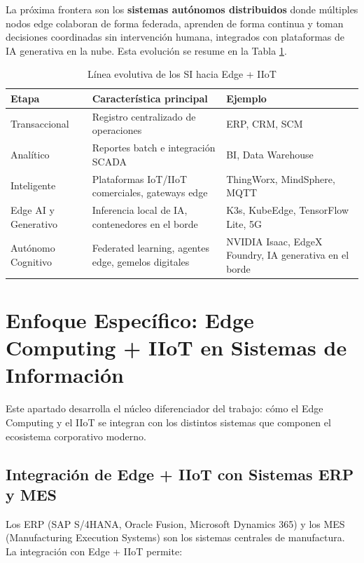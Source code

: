 ﻿\documentclass[12pt,a4paper,oneside]{article}
\begin{document}
La próxima frontera son los \textbf{sistemas autónomos distribuidos} donde múltiples nodos edge colaboran de forma federada, aprenden de forma continua y toman decisiones coordinadas sin intervención humana, integrados con plataformas de IA generativa en la nube. Esta evolución se resume en la Tabla \ref{tab:evolucion}.

\begin{table}[h!]
\centering
\caption{Línea evolutiva de los SI hacia Edge + IIoT}
\label{tab:evolucion}
\begin{tabular}{p{3.5cm} p{5cm} p{5cm}}
\toprule
\textbf{Etapa} & \textbf{Característica principal} & \textbf{Ejemplo} \\
\midrule
Transaccional & Registro centralizado de operaciones & ERP, CRM, SCM \\
Analítico & Reportes batch e integración SCADA & BI, Data Warehouse \\
Inteligente & Plataformas IoT/IIoT comerciales, gateways edge & ThingWorx, MindSphere, MQTT \\
Edge AI y Generativo & Inferencia local de IA, contenedores en el borde & K3s, KubeEdge, TensorFlow Lite, 5G \\
Autónomo Cognitivo & Federated learning, agentes edge, gemelos digitales & NVIDIA Isaac, EdgeX Foundry, IA generativa en el borde \\
\bottomrule
\end{tabular}
\end{table}

\section{Enfoque Específico: Edge Computing + IIoT en Sistemas de Información}

Este apartado desarrolla el núcleo diferenciador del trabajo: cómo el Edge Computing y el IIoT se integran con los distintos sistemas que componen el ecosistema corporativo moderno.

\subsection{Integración de Edge + IIoT con Sistemas ERP y MES}

Los ERP (SAP S/4HANA, Oracle Fusion, Microsoft Dynamics 365) y los MES (Manufacturing Execution Systems) son los sistemas centrales de manufactura. La integración con Edge + IIoT permite:
\end{document}
